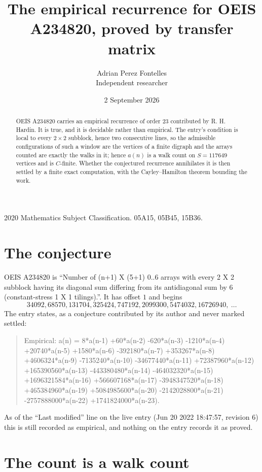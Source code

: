 \documentclass[11pt,a4paper]{article}
\title{The empirical recurrence for OEIS A234820, proved by transfer matrix}
\author{Adrian Perez Fontelles\\ \small Independent researcher}
\date{2 September 2026}
\theoremstyle{plain}
\theoremstyle{definition}
\begin{document}
\maketitle

\begin{abstract}
OEIS A234820 carries an empirical recurrence of order $23$ contributed by R. H. Hardin. It is
true, and it is decidable rather than empirical. The entry's condition is local to every $2\times2$ subblock, hence two consecutive lines, so
the admissible configurations of such a window are the vertices of a finite digraph and the
arrays counted are exactly the walks in it; hence $a(n)$ is a walk count on $S=117649$ vertices
and is $C$-finite. Whether the conjectured recurrence annihilates it is then settled by a
finite exact computation, with the Cayley--Hamilton theorem bounding the work.
\end{abstract}

\noindent\small 2020 Mathematics Subject Classification. 05A15, 05B45, 15B36.\normalsize

\section{The conjecture}

OEIS A234820 is ``Number of (n+1) X (5+1) 0..6 arrays with every 2 X 2 subblock having its diagonal sum differing from its antidiagonal sum by 6 (constant-stress 1 X 1 tilings).''. It has offset $1$ and begins
\[
34092, 68570, 131704, 325424, 747192, 2099300, 5474032, 16726940,\ \dots
\]
The entry states, as a conjecture contributed by its author and never marked settled:
\begin{quote}
Empirical: a(n) = 8*a(n-1) +60*a(n-2) -620*a(n-3) -1210*a(n-4) +20740*a(n-5) +1580*a(n-6) -392180*a(n-7) +353267*a(n-8) +4606324*a(n-9) -7135240*a(n-10) -34677440*a(n-11) +72387960*a(n-12) +165390560*a(n-13) -443380480*a(n-14) -464032320*a(n-15) +1696321584*a(n-16) +566607168*a(n-17) -3948347520*a(n-18) +465384960*a(n-19) +5084985600*a(n-20) -2142028800*a(n-21) -2757888000*a(n-22) +1741824000*a(n-23).
\end{quote}
As of the ``Last modified'' line on the live entry (Jun 20 2022 18:47:57, revision 6) this is still
recorded as empirical, and nothing on the entry records it as proved.

\section{The count is a walk count}
\end{document}
